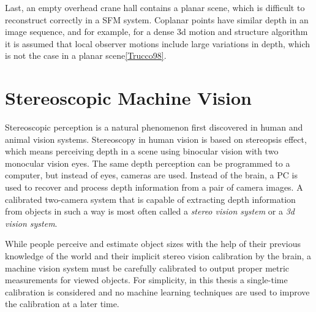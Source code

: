 \documentclass[12pt,a4paper,oneside,pdftex]{report}
\begin{document}
{Last, an empty overhead crane hall contains a planar scene, which is difficult to reconstruct correctly in a SFM system. Coplanar points have similar depth in an image sequence, and for example, for a dense 3d motion and structure algorithm it is assumed that local observer motions include large variations in depth, which is not the case in a planar scene\ref{Trucco98}.

\chapter{Stereoscopic Machine Vision}
\label{chapter:stereographic_machine_vision}
Stereoscopic perception is a natural phenomenon first discovered in human and animal vision systems. Stereoscopy in human vision is based on stereopsis effect, which means perceiving depth in a scene using binocular vision with two monocular vision eyes. The same depth perception can be programmed to a computer, but instead of eyes, cameras are used. Instead of the brain, a PC is used to recover and process depth information from a pair of camera images. A calibrated two-camera system that is capable of extracting depth information from objects in such a way is most often called a \emph{stereo vision system} or a \emph{3d vision system}.

While people perceive and estimate object sizes with the help of their previous knowledge of the world and their implicit stereo vision calibration by the brain, a machine vision system must be carefully calibrated to output proper metric measurements for viewed objects. For simplicity, in this thesis a single-time calibration is considered and no machine learning techniques are used to improve the calibration at a later time.

}
\end{document}
